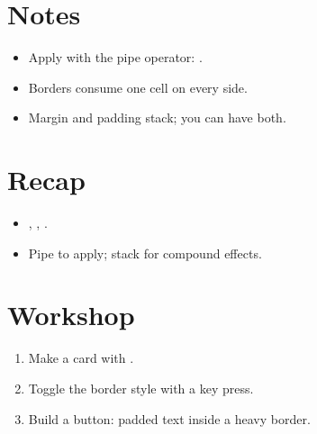 \section{Notes}

\begin{itemize}[leftmargin=*]
  \item Apply with the pipe operator: .
  \item Borders consume one cell on every side.
  \item Margin and padding stack; you can have both.
\end{itemize}

\section{Recap}

\begin{recap}
\begin{itemize}[leftmargin=*]
  \item {}, , .
  \item Pipe to apply; stack for compound effects.
\end{itemize}
\end{recap}

\section*{Workshop}

\begin{enumerate}[leftmargin=*]
  \item Make a card with .
  \item Toggle the border style with a key press.
  \item Build a button: padded text inside a heavy border.
\end{enumerate}
